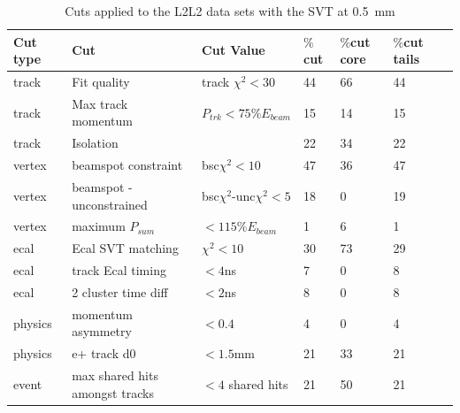 \begin{table}[H]
\caption{Cuts applied to the L2L2 data sets with the SVT at 0.5~mm}
\label{l2l2_cuts}
\centering
\begin{tabular}{lllllll}
\toprule
Cut type & Cut & Cut Value &  $\%$cut &  $\%$cut core & $\%$cut tails\\
\midrule
track & Fit quality & track $\chi^{2}<30$ & 44 & 66 & 44 \\
track & Max track momentum &  $P_{trk}<75\%E_{beam}$ & 15 & 14 & 15 \\
track & Isolation &   & 22 & 34 & 22 \\
vertex & beamspot constraint & bsc$\chi^{2}<10$  & 47 & 36 & 47 \\
vertex & beamspot - unconstrained & bsc$\chi^{2}$-unc$\chi^2<5$  & 18 & 0 & 19 \\
vertex & maximum $P_{sum}$ &  $<115\%E_{beam}$ & 1 & 6 & 1 \\
ecal & Ecal SVT matching & $\chi^2<10$  & 30 & 73 & 29 \\
ecal & track Ecal timing & $<4$ns  & 7 & 0 & 8 \\
ecal & 2 cluster time diff & $<2$ns  & 8 & 0 & 8 \\
physics & momentum asymmetry & $<0.4$  & 4 & 0 & 4 \\
physics & e+ track d0 & $<1.5$mm  & 21 & 33 & 21 \\
event & max shared hits amongst tracks & $<4$ shared hits  & 21 & 50 & 21 \\
\bottomrule
\end{tabular}
\end{table}
